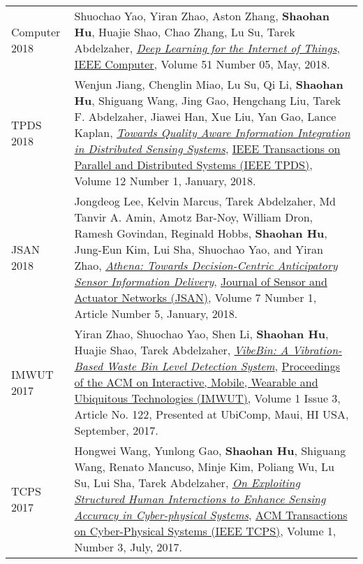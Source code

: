 \begin{longtabu}{p{.51\sectionwidth} p{.78\resumewidth}}
{\sc Computer 2018}\hypertarget{yao2018computer}{} &
Shuochao Yao, Yiran Zhao, Aston Zhang, \textbf{Shaohan Hu}, Huajie Shao, Chao Zhang, Lu Su, Tarek Abdelzaher,
\href{https://ieeexplore.ieee.org/document/8364644}{\emph{Deep Learning for the Internet of Things}},
\href{https://www.computer.org/csdl/magazines/co}{\textsf{IEEE Computer}},
Volume 51 Number 05, May, 2018. \\

{\sc TPDS 2018}\hypertarget{jiang2018tpds}{} &
Wenjun Jiang, Chenglin Miao, Lu Su, Qi Li, \textbf{Shaohan Hu}, Shiguang Wang, Jing Gao, Hengchang Liu, Tarek F. Abdelzaher, Jiawei Han, Xue Liu, Yan Gao, Lance Kaplan,
\href{http://ieeexplore.ieee.org/document/7940106/}{\emph{Towards Quality Aware Information Integration in Distributed Sensing Systems}},
\href{https://www.computer.org/web/tpds}{\textsf{IEEE Transactions on Parallel and Distributed Systems (IEEE TPDS)}},
Volume 12 Number 1, January, 2018. \\

{\sc JSAN 2018}\hypertarget{lee2018jsan}{} &
Jongdeog Lee, Kelvin Marcus, Tarek Abdelzaher, Md Tanvir A. Amin, Amotz Bar-Noy, William Dron, Ramesh Govindan, Reginald Hobbs, \textbf{Shaohan Hu}, Jung-Eun Kim, Lui Sha, Shuochao Yao, and Yiran Zhao,
\href{http://www.mdpi.com/2224-2708/7/1/5/htm}{\emph{Athena: Towards Decision-Centric Anticipatory Sensor Information Delivery}},
\href{http://www.mdpi.com/journal/jsan}{\textsf{Journal of Sensor and Actuator Networks (JSAN)}},
Volume 7 Number 1, Article Number 5, January, 2018. \\

{\sc IMWUT 2017}\hypertarget{zhao2017imwut}{} &
Yiran Zhao, Shuochao Yao, Shen Li, \textbf{Shaohan Hu}, Huajie Shao, Tarek Abdelzaher,
\href{https://dl.acm.org/citation.cfm?id=3132027}{\emph{VibeBin: A Vibration-Based Waste Bin Level Detection System}},
\href{https://imwut.acm.org/}{\textsf{Proceedings of the ACM on Interactive, Mobile, Wearable and Ubiquitous Technologies (IMWUT)}},
Volume 1 Issue 3, Article No. 122, Presented at UbiComp, Maui, HI USA, September, 2017. \\

{\sc TCPS 2017}\hypertarget{wang2017tcps}{} &
Hongwei Wang, Yunlong Gao, \textbf{Shaohan Hu}, Shiguang Wang, Renato Mancuso, Minje Kim, Poliang Wu, Lu Su, Lui Sha, Tarek Abdelzaher,
\href{http://dl.acm.org/citation.cfm?id=3064006}{\emph{On Exploiting Structured Human Interactions to Enhance Sensing Accuracy in Cyber-physical Systems}},
\href{http://tcps.acm.org/}{\textsf{ACM Transactions on Cyber-Physical Systems (IEEE TCPS)}},
Volume 1, Number 3, July, 2017. \\


\end{longtabu}
